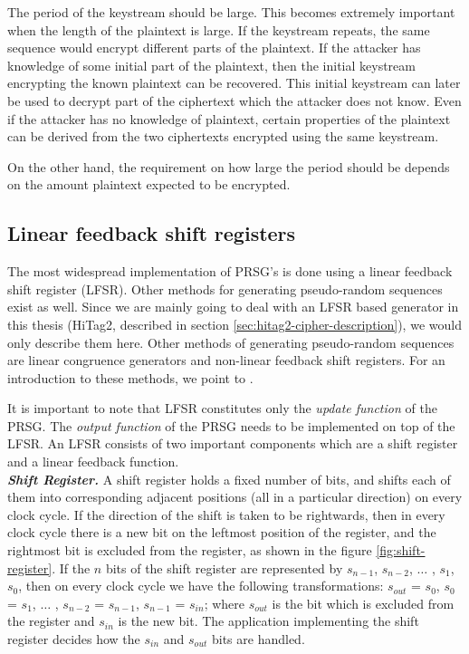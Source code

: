 The period of the keystream should be large. This becomes extremely important when the length of the plaintext is large. If the keystream repeats, the same sequence would encrypt different parts of the plaintext. If the attacker has knowledge of some initial part of the plaintext, then the initial keystream encrypting the known plaintext can be recovered. This initial keystream can later be used to decrypt part of the ciphertext which the attacker does not know. Even if the attacker has no knowledge of plaintext, certain properties of the plaintext can be derived from the two ciphertexts encrypted using the same keystream. 

On the other hand, the requirement on how large the period should be depends on the amount plaintext expected to be encrypted.

\subsection{Linear feedback shift registers} 
\label{sec:lfsr}
The most widespread implementation of PRSG's is done using a linear feedback shift register (LFSR). Other methods for generating pseudo-random sequences exist as well. Since we are mainly going to deal with an LFSR based generator in this thesis (HiTag2, described in section \ref{sec:hitag2-cipher-description}), we would only describe them here. Other methods of generating pseudo-random sequences are linear congruence generators and non-linear feedback shift registers. For an introduction to these methods, we point to \cite{zeng1991pbg}. 

It is important to note that LFSR constitutes only the \emph{update function} of the PRSG. The \emph{output function} of the PRSG needs to be implemented on top of the LFSR. An LFSR consists of two important components which are a shift register and a linear feedback function.\\

\noindent \textbf{\emph{Shift Register.}} A shift register holds a fixed number of bits, and shifts each of them into corresponding adjacent positions (all in a particular direction) on every clock cycle. If the direction of the shift is taken to be rightwards, then in every clock cycle there is a new bit on the leftmost position of the register, and the rightmost bit is excluded from the register, as shown in the figure \ref{fig:shift-register}. If the $n$ bits of the shift register are represented by $s_{n-1}$, $s_{n-2}$, $\ldots$ , $s_{1}$, $s_{0}$, then on every clock cycle we have the following transformations: $s_{out}$ = $s_{0}$, $s_{0}$ = $s_{1}$, $\ldots$ , $s_{n-2}$ = $s_{n-1}$, $s_{n-1}$ = $s_{in}$; where $s_{out}$ is the bit which is excluded from the register and $s_{in}$ is the new bit. The application implementing the shift register decides how the $s_{in}$ and $s_{out}$ bits are handled.

